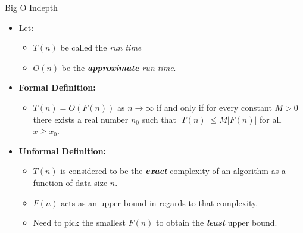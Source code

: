 \begin{frame}{Big O Indepth}

\begin{itemize}
\tightlist
\item
  Let:

  \begin{itemize}
  \tightlist
  \item
    \(T(n)\) be called the \emph{run time}
  \item
    \(O(n)\) be the \emph{\textbf{approximate} run time}.
  \end{itemize}
\item
  \textbf{Formal Definition:}

  \begin{itemize}
  \tightlist
  \item
    \(T(n) = O(F(n))\) as \(n \to \infty\) if and only if for every
    constant \(M > 0\) there exists a real number \(n_0\) such that
    \(\left| {T\left( n \right)} \right| \leqslant M\left| {F\left( n \right)} \right|\)
    for all \(x \ge x_0\).
  \end{itemize}
\item
  \textbf{Unformal Definition:}

  \begin{itemize}
  \tightlist
  \item
    \(T(n)\) is considered to be the \textbf{\emph{exact}} complexity of
    an algorithm as a function of data size \(n\).
  \item
    \(F(n)\) acts as an upper-bound in regards to that complexity.
  \item
    Need to pick the smallest \(F(n)\) to obtain the
    \textbf{\emph{least}} upper bound.
  \end{itemize}
\end{itemize}

\end{frame}


